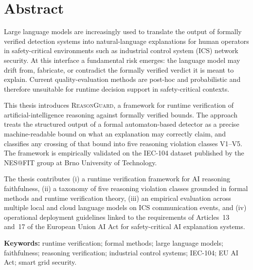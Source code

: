 \chapter*{Abstract}

Large language models are increasingly used to translate the output of formally
verified detection systems into natural-language explanations for human operators in
safety-critical environments such as industrial control system (ICS) network security.
At this interface a fundamental risk emerges: the language model may drift from,
fabricate, or contradict the formally verified verdict it is meant to explain. Current
quality-evaluation methods are post-hoc and probabilistic and therefore unsuitable for
runtime decision support in safety-critical contexts.

This thesis introduces \textsc{ReasonGuard}, a framework for runtime verification of
artificial-intelligence reasoning against formally verified bounds. The approach
treats the structured output of a formal automaton-based detector as a precise
machine-readable bound on what an explanation may correctly claim, and classifies any
crossing of that bound into five reasoning violation classes V1--V5. The framework is
empirically validated on the IEC-104 dataset published by the NES@FIT group at Brno
University of Technology.

The thesis contributes (i) a runtime verification framework for AI reasoning
faithfulness, (ii) a taxonomy of five reasoning violation classes grounded in formal
methods and runtime verification theory, (iii) an empirical evaluation across multiple
local and cloud language models on ICS communication events, and (iv) operational
deployment guidelines linked to the requirements of Articles~13 and~17 of the
European Union AI Act for safety-critical AI explanation systems.
\bigskip

\noindent\textbf{Keywords:} runtime verification; formal methods; large language
models; faithfulness; reasoning verification; industrial control systems; IEC-104; EU
AI Act; smart grid security.
